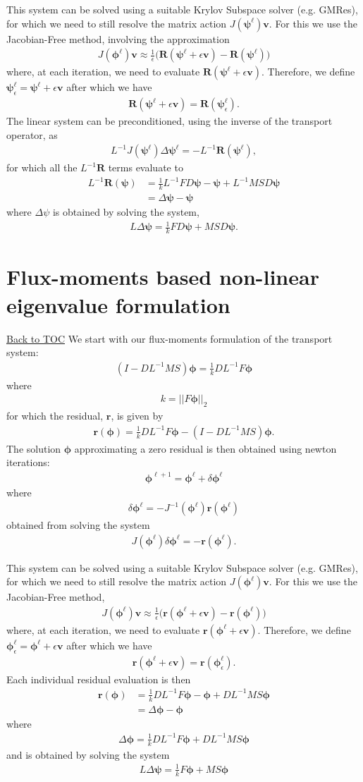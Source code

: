 \documentclass[11pt,letterpaper,notitlepage]{article}
\newcommand{\beqn}{\begin{equation}
		\begin{aligned}}
\newcommand{\eeqn}{\end{aligned}
\end{equation}}
\numberwithin{equation}{section}
\newcommand{\Linv}{L^{-1}}
\newcommand{\bphi}{\boldsymbol{\phi}}
\newcommand{\bpsi}{\boldsymbol{\psi}}
\newcommand{\br}{\mathbf{r}}
\newcommand{\bR}{\mathbf{R}}
\newcommand{\BackToTOC}{\hyperlink{toc}{\scriptsize{\color{blue}Back to TOC}}\newline}
\begin{document}
This system can be solved using a suitable Krylov Subspace solver (e.g. GMRes), for which we need to still resolve the matrix action $J(\bpsi^{\ell})\mathbf{v}$. For this we use the Jacobian-Free method, involving the approximation 
\beqn 
J(\bphi^{\ell})\mathbf{v} \approx \frac{1}{\epsilon} \biggr(\bR(\bpsi^\ell + \epsilon \mathbf{v}) - \bR(\bpsi^\ell)\biggr)
\eeqn 
where, at each iteration, we need to evaluate $\bR(\bpsi^\ell + \epsilon \mathbf{v})$. Therefore, we define $\bpsi_\epsilon^\ell = \bpsi^\ell + \epsilon \mathbf{v}$ after which we have
\beqn 
\bR(\bpsi^\ell + \epsilon \mathbf{v}) = \bR(\bpsi_\epsilon^\ell).
\eeqn 
\newline
\newline
The linear system can be preconditioned, using the inverse of the transport operator, as
\beqn 
\Linv J(\bpsi^{\ell}) \Delta \bpsi^{\ell} = -\Linv \bR(\bpsi^{\ell}),
\eeqn 
for which all the $\Linv \bR$ terms evaluate to
\beqn
\Linv \bR(\bpsi) &= \frac{1}{k} \Linv FD\bpsi - \bpsi + \Linv MSD\bpsi \\
&= \Delta \bpsi - \bpsi
\eeqn 
where $\Delta \psi$ is obtained by solving the system,
\beqn 
L\Delta \bpsi = \frac{1}{k} FD\bpsi + MSD\bpsi.
\eeqn 

\newpage
{}
\section{Flux-moments based non-linear eigenvalue formulation}
\BackToTOC
We start with our flux-moments formulation of the transport system:
\beqn 
(I-D\Linv MS) \bphi = \frac{1}{k} D\Linv F\bphi
\eeqn 
where 
\beqn 
k = ||F\bphi ||_2
\eeqn 
for which the residual, $\br$, is given by
\beqn 
\br(\bphi) = \frac{1}{k} D\Linv F\bphi - (I-D\Linv MS) \bphi.
\eeqn 
The solution $\bphi$ approximating a zero residual is then obtained using newton iterations:
\beqn 
\bphi^{\ell+1} = \bphi^{\ell}  + \delta \bphi^{\ell}
\eeqn
where
\beqn
\delta \bphi^{\ell} = - J^{-1}(\bphi^{\ell}) \br(\bphi^{\ell})
\eeqn 
obtained from solving the system
\beqn 
J(\bphi^{\ell}) \delta \bphi^{\ell} = -\br(\bphi^{\ell}).
\eeqn 

This system can be solved using a suitable Krylov Subspace solver (e.g. GMRes), for which we need to still resolve the matrix action $J(\bphi^{\ell})\mathbf{v}$. For this we use the Jacobian-Free method,
\beqn 
J(\bphi^{\ell})\mathbf{v} \approx \frac{1}{\epsilon} \biggr(\br(\bphi^\ell + \epsilon \mathbf{v}) - \br(\bphi^\ell)\biggr)
\eeqn 
where, at each iteration, we need to evaluate $\br(\bphi^\ell + \epsilon \mathbf{v})$. Therefore, we define $\bphi_\epsilon^\ell = \bphi^\ell + \epsilon \mathbf{v}$ after which we have
\beqn 
\br(\bphi^\ell + \epsilon \mathbf{v}) = \br(\bphi_\epsilon^\ell).
\eeqn 
Each individual residual evaluation is then 
\beqn 
\br(\bphi) 
&= \frac{1}{k} D\Linv F \bphi - \bphi + D\Linv MS \bphi \\
&= \Delta \bphi - \bphi
\eeqn 
where
\beqn 
\Delta \bphi = \frac{1}{k} D\Linv F \bphi + D\Linv MS \bphi
\eeqn 
and is obtained by solving the system
\beqn 
L \Delta \bpsi  =  \frac{1}{k} F \bphi + MS \bphi
\eeqn 
\end{document}
